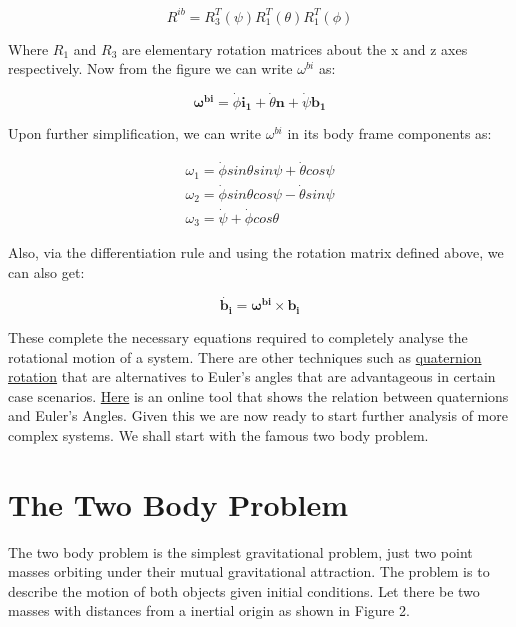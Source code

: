 \documentclass[12pt, letterpaper]{article}
\begin{document}
\begin{displaymath}
R^{ib} = R_3^{T}(\psi)R_1^{T}(\theta)R_1^{T}(\phi)
\end{displaymath}

Where $R_1$ and $R_3$ are elementary rotation matrices about the x and z axes respectively. Now from the figure we can write $\omega^{bi}$ as:

\begin{displaymath}
\mathbf{\omega^{bi}} = \dot{\phi}\mathbf{i_1} + \dot{\theta}\mathbf{n} + \dot{\psi}\mathbf{b_1}
\end{displaymath}

Upon further simplification, we can write $\omega^{bi}$ in its body frame components as:

\begin{gather*}
\omega_1 = \dot{\phi}sin{\theta}sin{\psi} + \dot{\theta}cos\psi\\
\omega_2 = \dot{\phi}sin{\theta}cos{\psi} - \dot{\theta}sin\psi\\
\omega_3 = \dot{\psi} + \dot{\phi}cos\theta
\end{gather*}

Also, via the differentiation rule and using the rotation matrix defined above, we can also get:

\begin{displaymath}
\dot{\mathbf{b_i}} = \mathbf{\omega^{bi}}\times\mathbf{b_i}
\end{displaymath}

These complete the necessary equations required to completely analyse the rotational motion of a system. There are other techniques such as \href{https://en.wikipedia.org/wiki/Quaternion}{quaternion rotation} that are alternatives to Euler's angles that are advantageous in certain case scenarios. \href{https://quaternions.online}{Here} is an online tool that shows the relation between quaternions and Euler's Angles. Given this we are now ready to start further analysis of more complex systems. We shall start with the famous two body problem.

\newpage
\section{The Two Body Problem}
 The two body problem is the simplest gravitational problem, just two point masses orbiting under their mutual gravitational attraction. The problem is to describe the motion of both objects given initial conditions. Let there be two masses with distances from a inertial origin as shown in Figure 2.
\end{document}
